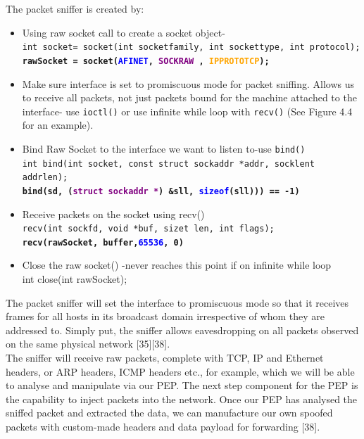 \documentclass{uathesis}
\begin{document}
The packet sniffer is created by: 
    \begin{itemize}
        \item Using raw socket call to create a socket object- \\
        {\tt int socket= socket(int socket\textunderscore family, int socket\textunderscore type, int protocol);}\\
{\tt \textbf{rawSocket = socket(\textcolor{blue}{AF\textunderscore INET}, \textcolor{purple}{SOCK\textunderscore RAW} , \textcolor{orange}{IPPROTO\textunderscore TCP});}}
        \item Make sure interface is set to promiscuous mode for packet sniffing. Allows us to receive all packets, not just packets bound for the machine attached to the interface- use {\tt ioctl()} or use infinite while loop with {\tt recv()} (See Figure 4.4 for an example).
        
        \item Bind Raw Socket to the interface we want to listen to-use {\tt bind()}\\
{\tt int bind(int socket, const struct sockaddr *addr, socklen\textunderscore t addrlen);}\\
{\tt \textbf{bind(sd, (\textcolor{purple}{struct sockaddr *}) \&sll, \textcolor{blue}{sizeof}(sll))) == -1)}}
\item Receive packets on the socket using recv()\\
{\tt recv(int sockfd, void *buf, size\textunderscore t len, int flags);}\\
{ \tt \textbf{recv(rawSocket, buffer,\textcolor{blue}{65536}, 0)}}

        \item Close the raw socket() -never reaches this point if on infinite while loop\\
        int close(int rawSocket);\\
    \end{itemize}
    
The packet sniffer will set the interface to promiscuous mode so that it receives frames for all hosts in its broadcast domain irrespective of whom they are addressed to. Simply put, the sniffer allows eavesdropping on all packets observed on the same physical network [35][38].\\

The sniffer will receive raw packets, complete with TCP, IP and Ethernet headers, or ARP headers, ICMP headers etc., for example, which we will be able to analyse and manipulate via our PEP. The next step component for the PEP is the capability to inject packets into the network. Once our PEP has analysed the sniffed packet and extracted the data, we can manufacture our own spoofed packets with custom-made headers and data payload for forwarding [38].\\
\end{document}
